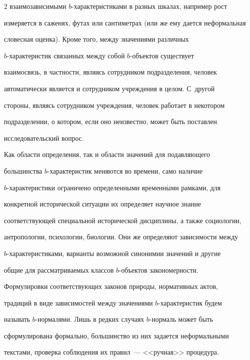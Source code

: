 \begin{multicols}{2}
взаимозависимыми $b$-ха\-рак\-те\-ри\-сти\-ка\-ми в разных шкалах, например рост 


измеряется в саженях, футах или сантиметрах (или же ему дается неформальная 


словесная оценка). Кроме того, между значениями различных 


  $b$-ха\-рак\-те\-ристик связанных между собой $b$-объек\-тов существует 


взаимосвязь, в частности, являясь сотрудником подразделения, человек 


автоматически является и сотрудником учреждения в целом. С~другой 


стороны, являясь сотрудником учреждения, человек работает в некотором 


подразделении, о котором, если оно неизвестно, может быть поставлен 


исследовательский вопрос.


  


  Как области определения, так и области значений для подавляющего 


большинства $b$-ха\-рак\-те\-ри\-стик меняются во времени, само наличие 


  $b$-ха\-рак\-те\-ри\-сти\-ки ограничено определенными временн$\acute{\mbox{ы}}$ми рамками, для 


конкретной исторической ситуации их определяет научное знание 


соответствующей специальной исторической дис\-цип\-ли\-ны, а также социологии, 


антропологии, психологии, биологии. Они же определяют зависимости между 


$b$-ха\-рак\-те\-ри\-сти\-ка\-ми, варианты возможной синонимии значений и другие 


общие для рассматриваемых классов $b$-объек\-тов закономерности. 


Формулировки соответствующих законов природы, нормативных актов, 


традиций в виде зависимостей между значениями $b$-ха\-рак\-те\-ри\-стик будем 


называть $b$-нор\-ма\-ля\-ми. Лишь в редких случаях $b$-нор\-маль может быть 


сформулирована формально, большинство из них задается неформальными 


текстами, проверка соблюдения их правил~--- <<ручная>> процедура. 






\end{multicols}
